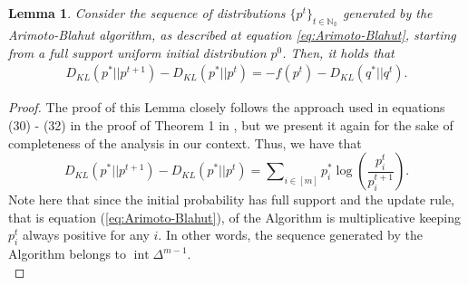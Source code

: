 \documentclass[11pt, letterpaper]{article}
\newtheorem{lemma}{Lemma}
\DeclareMathOperator{\interior}{int}
\begin{document}
\begin{lemma}
\label{lemma:Difference of KL- f}
Consider the sequence of distributions $\{p^t\}_{t \in \mathbb{N_0}}$ generated by the Arimoto-Blahut algorithm, as described at equation \eqref{eq:Arimoto-Blahut}, starting from a full support uniform initial distribution $p^0$. Then, it holds that
\begin{equation}\label{Difference of KL- f}
\begin{split}
D_{KL}(p^*||p^{t+1}) - D_{KL}(p^*||p^{t}) = - f(p^t)- D_{KL}(q^*||q^t).
\end{split}
\end{equation}
\end{lemma}
\begin{proof}
The proof of this Lemma closely follows the approach used in equations (30) - (32) in the proof of Theorem 1 in \cite{Arimoto1972AnAF}, but we present it again for the sake of completeness of the analysis in our context.
 Thus, we have that
\begin{equation*}\label{eq:thm3eq1}
    D_{KL}(p^*||p^{t+1}) - D_{KL}(p^*||p^{t}) = \sum\nolimits_{i \in [m]} p^*_i \log\left(\frac{p^t_i}{p^{t+1}_i}\right).
\end{equation*}
Note here that since the initial probability has full support and the update rule, that is equation (\ref{eq:Arimoto-Blahut}), of the Algorithm is multiplicative keeping $p^t_i$ always positive for any $i$. In other words, the sequence generated by the Algorithm belongs to $\interior \Delta^{m-1}$.\\


\end{proof}
\end{document}
